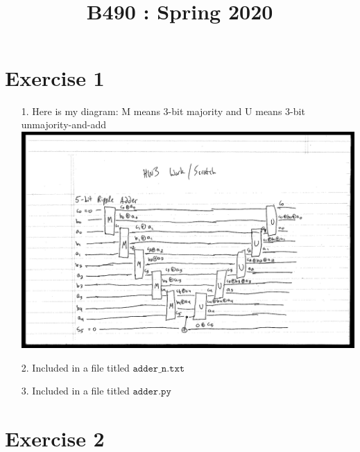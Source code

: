\documentclass[11pt]{article}
\title{
    \vspace{2in}
    \textmd{\textbf{\tit}}\\
    \normalsize\vspace{0.1in}\small{B490 : Spring 2020 }\\
    \vspace{0.1in}\large{\textit{\auths}}
    \vspace{3in}
}
\date{}
\begin{document}
\maketitle
\pagebreak

\section{Exercise 1}

\begin{enumerate}
\item[1.] Here is my diagram: M means 3-bit majority and U means 3-bit unmajority-and-add \\ 

\includegraphics[width=\textwidth]{adder_img}


\item[2.] Included in a file titled $\texttt{adder\_n.txt}$

\item[3.] Included in a file titled $\texttt{adder.py}$ \\

\end{enumerate}

\newpage

\section{Exercise 2}
\end{document}
